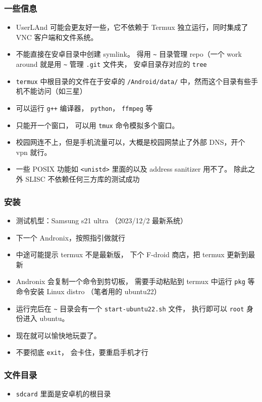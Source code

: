 

\begin{issues}
\issueDraft
\end{issues}

\subsubsection{一些信息}
\begin{itemize}
\item UserLAnd 可能会更友好一些，它不依赖于 Termux 独立运行，同时集成了 VNC 客户端和文件系统。
\item 不能直接在安卓目录中创建 symlink。 得用 \verb`~` 目录管理 repo（一个 work around 就是用 \verb`~` 管理 \verb`.git` 文件夹， 安卓目录存对应的 \verb`tree`
\item \verb`termux` 中根目录的文件在于安卓的 \verb`/Android/data/` 中，然而这个目录有些手机不能访问（如三星）
\item 可以运行 \verb`g++` 编译器， \verb`python`， \verb`ffmpeg` 等
\item 只能开一个窗口， 可以用 \verb`tmux` 命令模拟多个窗口。
\item 校园网连不上，但是手机流量可以，大概是校园网禁止了外部 DNS，开个 vpn 就行。
\item 一些 POSIX 功能如 \verb`<unistd>` 里面的以及 address sanitizer 用不了。 除此之外 SLISC 不依赖任何三方库的测试成功
\end{itemize}

\subsubsection{安装}
\begin{itemize}
\item 测试机型：Samsung s21 ultra （2023/12/2 最新系统）
\item 下一个 Andronix，按照指引做就行
\item 中途可能提示 termux 不是最新版， 下个 F-droid 商店，把 termux 更新到最新
\item Andronix 会复制一个命令到剪切板， 需要手动粘贴到 termux 中运行 \verb`pkg` 等命令安装 Linux distro （笔者用的 ubuntu22）
\item 运行完后在 \verb`~` 目录会有一个 \verb`start-ubuntu22.sh` 文件， 执行即可以 \verb`root` 身份进入 ubuntu。
\item 现在就可以愉快地玩耍了。
\item 不要彻底 \verb`exit`， 会卡住，要重启手机才行
\end{itemize}

\subsubsection{文件目录}
\begin{itemize}
\item \verb`sdcard` 里面是安卓机的根目录
\end{itemize}
